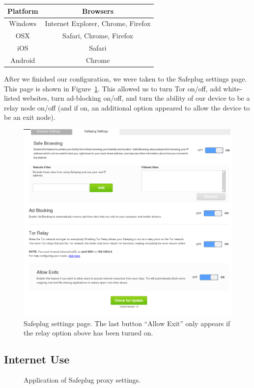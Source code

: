 \documentclass[conference]{IEEEtran}
\begin{document}
\begin{center}
	\begin{tabular}{|c|c|}
	\hline
		Platform & Browsers \\ \hline
		Windows	& Internet Explorer, Chrome, Firefox \\ \hline
		OSX & Safari, Chrome, Firefox \\ \hline
		iOS	& Safari \\ \hline
		Android	& Chrome \\ \hline
	\end{tabular}
\end{center}

After we finished our configuration, we were taken to the Safeplug settings page.  This page is shown in Figure~\ref{fig:settings}.  This allowed us to turn Tor on/off, add white-listed websites, turn ad-blocking on/off, and turn the ability of our device to be a relay node on/off (and if on, an additional option appeared to allow the device to be an exit node).  

\begin{figure}[htb]
  \centering
  \includegraphics[width=.4\textwidth]{settings_with_exit}
  \caption{Safeplug settings page.  The last button ``Allow Exit'' only appears if the relay option above has been turned on.}
  \label{fig:settings}
\end{figure}

\subsection{Internet Use}
\label{inetuse}

\begin{figure}[tb]
\centering
{}
\quad
{}
\caption{Application of Safeplug proxy settings.}
\end{figure}
\end{document}
